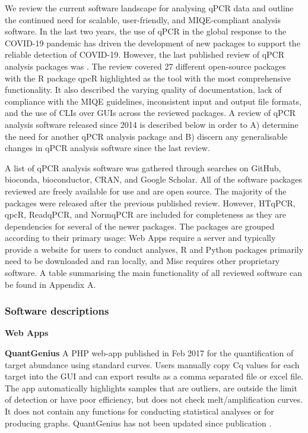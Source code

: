 \documentclass[../main.tex]{subfiles}
\begin{document}
We review the current software landscape for analysing qPCR data and outline the continued need for scalable, user-friendly, and MIQE-compliant analysis software.
In the last two years, the use of qPCR in the global response to the COVID-19 pandemic has driven the development of new packages to support the reliable detection of COVID-19.
However, the last published review of qPCR analysis packages was \cite{Pabinger2014}.
The review covered 27 different open-source packages with the R package qpcR highlighted as the tool with the most comprehensive functionality.
It also described the varying quality of documentation, lack of compliance with the MIQE guidelines, inconsistent input and output file formats, and the use of CLIs over GUIs across the reviewed packages.
A review of qPCR analysis software released since 2014 is described below in order to A) determine the need for another qPCR analysis package and B) discern any generalisable changes in qPCR analysis software since the last review.

A list of qPCR analysis software was gathered through searches on GitHub, bioconda, bioconductor, CRAN, and Google Scholar.
All of the software packages reviewed are freely available for use and are open source.
The majority of the packages were released after the previous published review.
However, HTqPCR, qpcR, ReadqPCR, and NormqPCR are included for completeness as they are dependencies for several of the newer packages.
The packages are grouped according to their primary usage: Web Apps require a server and typically provide a website for users to conduct analyses, R and Python packages primarily need to be downloaded and ran locally, and Misc requires other proprietary software. A table summarising the main functionality of all reviewed software can be found in Appendix A.

\subsubsection{Software descriptions}

\textbf{Web Apps}

\textbf{QuantGenius} A PHP web-app published in Feb 2017 for the quantification of target abundance using standard curves. 
Users manually copy Cq values for each target into the GUI and can export results as a comma separated file or excel file. 
The app automatically highlights samples that are outliers, are outside the limit of detection or have poor efficiency, but does not check melt/amplification curves. 
It does not contain any functions for conducting statistical analyses or for producing graphs. 
QuantGenius has not been updated since publication \parencite{Baebler2017}.
\end{document}
